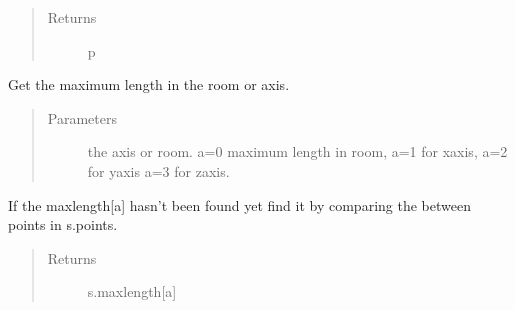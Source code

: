 \documentclass[letterpaper,10pt,english]{sphinxmanual}
\begin{document}
\begin{fulllineitems}
\begin{fulllineitems}
\begin{sphinxVerbatim}[commandchars=\\\{\}]
\PYG{p}{[}\PYG{p}{[}\PYG{p}{]} \PYG{p}{[}\PYG{p}{]}
  \PYG{p}{[}\PYG{p}{]} \PYG{p}{[} \PYG{p}{]}
\end{sphinxVerbatim}
\begin{quote}\begin{description}
\item[{Returns}] \leavevmode
p

\end{description}\end{quote}

\end{fulllineitems}


\begin{fulllineitems}
\label{\detokenize{index:Room.room.maxleng}}
Get the maximum length in the room or axis.
\begin{quote}\begin{description}
\item[{Parameters}] \leavevmode
{} \textendash{} the axis or room. a=0 maximum length in room, a=1 for     x\sphinxhyphen{}axis, a=2 for y\sphinxhyphen{}axis a=3 for z\sphinxhyphen{}axis.

\end{description}\end{quote}

If the maxlength{[}a{]} hasn’t been found yet find it by comparing the     between points in s.points.
\begin{quote}\begin{description}
\item[{Returns}] \leavevmode
s.maxlength{[}a{]}

\end{description}\end{quote}


\end{fulllineitems}
\end{fulllineitems}
\end{document}
